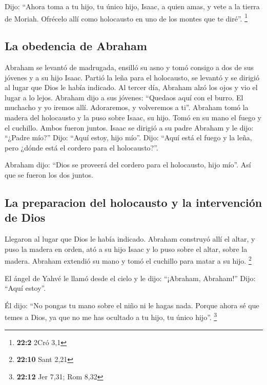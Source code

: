 \begin{paracol}{2}
 Dijo: ``Ahora toma a tu hijo, tu único hijo, Isaac, a
quien amas, y vete a la tierra de Moriah. Ofrécelo allí como holocausto
en uno de los montes que te diré''. \footnote{\textbf{22:2} 2Cró 3,1}

\hypertarget{la-obedencia-de-abraham}{%
\subsection{La obedencia de Abraham}\label{la-obedencia-de-abraham}}

 Abraham se levantó de madrugada, ensilló su asno y tomó
consigo a dos de sus jóvenes y a su hijo Isaac. Partió la leña para el
holocausto, se levantó y se dirigió al lugar que Dios le había indicado.
 Al tercer día, Abraham alzó los ojos y vio el lugar a lo
lejos.  Abraham dijo a sus jóvenes: ``Quedaos aquí con el
burro. El muchacho y yo iremos allí. Adoraremos, y volveremos a ti''.
 Abraham tomó la madera del holocausto y la puso sobre
Isaac, su hijo. Tomó en su mano el fuego y el cuchillo. Ambos fueron
juntos.  Isaac se dirigió a su padre Abraham y le dijo:
``¿Padre mío?'' Dijo: ``Aquí estoy, hijo mío''. Dijo: ``Aquí está el
fuego y la leña, pero ¿dónde está el cordero para el holocausto?''.

 Abraham dijo: ``Dios se proveerá del cordero para el
holocausto, hijo mío''. Así que se fueron los dos juntos.

\hypertarget{la-preparacion-del-holocausto-y-la-intervenciuxf3n-de-dios}{%
\subsection{La preparacion del holocausto y la intervención de
Dios}\label{la-preparacion-del-holocausto-y-la-intervenciuxf3n-de-dios}}

 Llegaron al lugar que Dios le había indicado. Abraham
construyó allí el altar, y puso la madera en orden, ató a su hijo Isaac
y lo puso sobre el altar, sobre la madera.  Abraham
extendió su mano y tomó el cuchillo para matar a su hijo. \footnote{\textbf{22:10}
  Sant 2,21}

 El ángel de Yahvé le llamó desde el cielo y le dijo:
``¡Abraham, Abraham!'' Dijo: ``Aquí estoy''.

 Él dijo: ``No pongas tu mano sobre el niño ni le hagas
nada. Porque ahora sé que temes a Dios, ya que no me has ocultado a tu
hijo, tu único hijo''. \footnote{\textbf{22:12} Jer 7,31; Rom 8,32}


\end{paracol}
